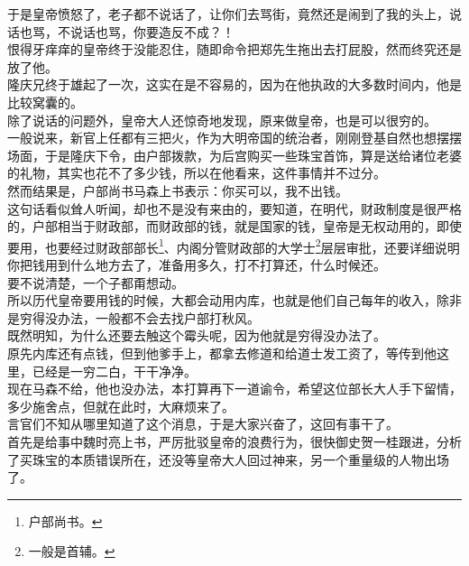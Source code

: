 \begin{multicols}{\theparacolNo}
于是皇帝愤怒了，老子都不说话了，让你们去骂街，竟然还是闹到了我的头上，说话也骂，不说话也骂，你要造反不成？！\\

恨得牙痒痒的皇帝终于没能忍住，随即命令把郑先生拖出去打屁股，然而终究还是放了他。\\

隆庆兄终于雄起了一次，这实在是不容易的，因为在他执政的大多数时间内，他是比较窝囊的。\\

除了说话的问题外，皇帝大人还惊奇地发现，原来做皇帝，也是可以很穷的。\\

一般说来，新官上任都有三把火，作为大明帝国的统治者，刚刚登基自然也想摆摆场面，于是隆庆下令，由户部拨款，为后宫购买一些珠宝首饰，算是送给诸位老婆的礼物，其实也花不了多少钱，所以在他看来，这件事情并不过分。\\

然而结果是，户部尚书马森上书表示：你买可以，我不出钱。\\

这句话看似耸人听闻，却也不是没有来由的，要知道，在明代，财政制度是很严格的，户部相当于财政部，而财政部的钱，就是国家的钱，皇帝是无权动用的，即使要用，也要经过财政部部长\footnote{户部尚书。}、内阁分管财政部的大学士\footnote{一般是首辅。}层层审批，还要详细说明你把钱用到什么地方去了，准备用多久，打不打算还，什么时候还。\\

要不说清楚，一个子都甭想动。\\

所以历代皇帝要用钱的时候，大都会动用内库，也就是他们自己每年的收入，除非是穷得没办法，一般都不会去找户部打秋风。\\

既然明知，为什么还要去触这个霉头呢，因为他就是穷得没办法了。\\

原先内库还有点钱，但到他爹手上，都拿去修道和给道士发工资了，等传到他这里，已经是一穷二白，干干净净。\\

现在马森不给，他也没办法，本打算再下一道谕令，希望这位部长大人手下留情，多少施舍点，但就在此时，大麻烦来了。\\

言官们不知从哪里知道了这个消息，于是大家兴奋了，这回有事干了。\\

首先是给事中魏时亮上书，严厉批驳皇帝的浪费行为，很快御史贺一桂跟进，分析了买珠宝的本质错误所在，还没等皇帝大人回过神来，另一个重量级的人物出场了。\\


\end{multicols}
